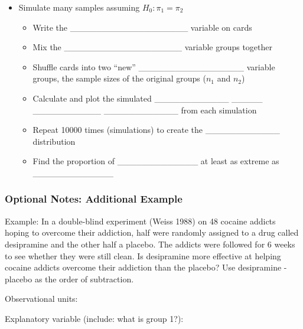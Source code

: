 \documentclass[
]{report}
\begin{document}

\begin{itemize}
\item
  Simulate many samples assuming \(H_0: \pi_1 = \pi_2\)

  \begin{itemize}
  \item
    Write the \_\_\_\_\_\_\_\_\_\_\_\_\_\_\_\_\_\_\_ variable on cards
  \item
    Mix the \_\_\_\_\_\_\_\_\_\_\_\_\_\_\_\_\_\_\_ variable groups together
  \item
    Shuffle cards into two ``new'' \_\_\_\_\_\_\_\_\_\_\_\_\_\_\_\_\_ variable groups, the sample sizes of the original groups (\(n_1\) and \(n_2\))
  \item
    Calculate and plot the simulated \_\_\_\_\_\_\_\_\_\_\_\_ \_\_\_\_\_ \_\_\_\_\_\_\_\_\_\_\_ \_\_\_\_\_\_\_\_\_\_\_\_ from each simulation
  \item
    Repeat 10000 times (simulations) to create the \_\_\_\_\_\_\_\_\_\_\_\_ distribution
  \item
    Find the proportion of \_\_\_\_\_\_\_\_\_\_\_\_\_ at least as extreme as \_\_\_\_\_\_\_\_\_\_\_\_\_
  \end{itemize}
\end{itemize}


\subsubsection*{Optional Notes: Additional Example}\label{optional-notes-additional-example-10}

Example: In a double-blind experiment (Weiss 1988) on 48 cocaine addicts hoping to overcome their addiction, half were randomly assigned to a drug called desipramine and the other half a placebo. The addicts were followed for 6 weeks to see whether they were still clean. Is desipramine more effective at helping cocaine addicts overcome their addiction than the placebo? Use desipramine - placebo as the order of subtraction.

Observational units:

\vspace{0.2in}

Explanatory variable (include: what is group 1?):

\vspace{0.2in}
\end{document}
